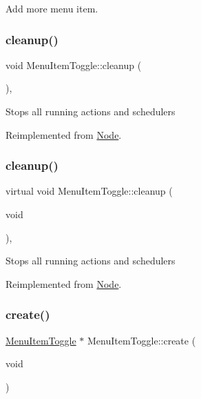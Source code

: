 Add more menu item. \mbox{\label{classMenuItemToggle_a07c137c20a38647fe07e948fa14fbe42}} 
\subsubsection{\texorpdfstring{cleanup()}{cleanup()}\hspace{0.1cm}{\footnotesize\ttfamily [1/2]}}
{\footnotesize\ttfamily void Menu\+Item\+Toggle\+::cleanup (\begin{DoxyParamCaption}{ }\end{DoxyParamCaption})\hspace{0.3cm}{\ttfamily [override]}, {\ttfamily [virtual]}}

Stops all running actions and schedulers 

Reimplemented from \hyperlink{classNode_aa2de84c6cdeec9cd647d236c30ee0567}{Node}.

\mbox{\label{classMenuItemToggle_a4e70a16bd34c5e770e55e5bf1591aa62}} 
\subsubsection{\texorpdfstring{cleanup()}{cleanup()}\hspace{0.1cm}{\footnotesize\ttfamily [2/2]}}
{\footnotesize\ttfamily virtual void Menu\+Item\+Toggle\+::cleanup (\begin{DoxyParamCaption}\item[{void}]{ }\end{DoxyParamCaption})\hspace{0.3cm}{\ttfamily [override]}, {\ttfamily [virtual]}}

Stops all running actions and schedulers 

Reimplemented from \hyperlink{classNode_aa2de84c6cdeec9cd647d236c30ee0567}{Node}.

\mbox{\label{classMenuItemToggle_a79e7e5d6269c9677096ed9de182c6197}} 
\subsubsection{\texorpdfstring{create()}{create()}\hspace{0.1cm}{\footnotesize\ttfamily [1/4]}}
{\footnotesize\ttfamily \hyperlink{classMenuItemToggle}{Menu\+Item\+Toggle} $\ast$ Menu\+Item\+Toggle\+::create (\begin{DoxyParamCaption}\item[{void}]{ }\end{DoxyParamCaption})\hspace{0.3cm}{\ttfamily [static]}}


